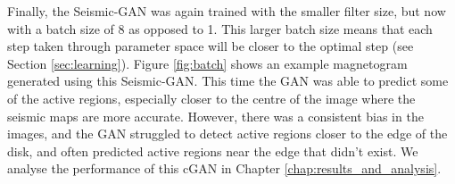 \documentclass[11pt,a4paper,onecolumn]{report}
\begin{document}
Finally, the Seismic-GAN was again trained with the smaller filter size, but now
with a batch size of 8 as opposed to 1. This larger batch size means that each
step taken through parameter space will be closer to the optimal step (see
Section \ref{sec:learning}). Figure \ref{fig:batch} shows an example magnetogram
generated using this Seismic-GAN. This time the GAN was able to predict some of
the active regions, especially closer to the centre of the image where the
seismic maps are more accurate. However, there was a consistent bias in the
images, and the GAN struggled to detect active regions closer to the edge of the
disk, and often predicted active regions near the edge that didn't exist. We
analyse the performance of this cGAN in Chapter \ref{chap:results_and_analysis}.
\end{document}
